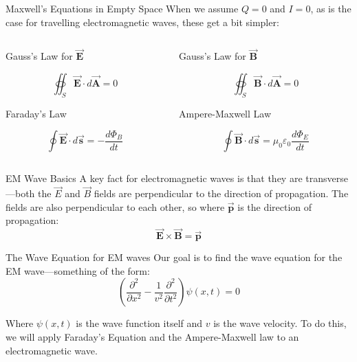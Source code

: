 \documentclass{beamer}
\begin{document}
\begin{frame}{Maxwell's Equations in Empty Space}
    When we assume $Q=0$ and $I=0$, as is the case for travelling electromagnetic waves, these get a bit simpler:
    \begin{columns}
    \begin{column}{0.5\textwidth}
        \begin{center}
            Gauss's Law for $\vec{\mathbf{E}}$
        \end{center}
       \[ \oiint_S \vec{\mathbf{E}}\cdot d\vec{\mathbf{A}} = 0 \]
        \begin{center}
            Faraday's Law
        \end{center}
        \[ \oint \vec{\mathbf{E}}\cdot d\vec{\mathbf{s}} = -\frac{d\Phi_B}{dt}\]
    \end{column}
    
    \begin{column}{0.5\textwidth}
        \begin{center}
            Gauss's Law for $\vec{\mathbf{B}}$
        \end{center}
       \[ \oiint_S \vec{\mathbf{B}}\cdot d\vec{\mathbf{A}} = 0 \]
        \begin{center}
            Ampere-Maxwell Law
        \end{center}
        \[ \oint \vec{\mathbf{B}}\cdot d\vec{\mathbf{s}} = \mu_0\varepsilon_0\frac{d\Phi_E}{dt}\]
    \end{column}
    \end{columns}
\end{frame}

\begin{frame}{EM Wave Basics}
    A key fact for electromagnetic waves is that they are \alert{transverse}---both the $\vec{E}$ and $\vec{B}$ fields are perpendicular to the direction of propagation. The fields are also perpendicular to each other, so where $\vec{\mathbf{p}}$ is the direction of propagation:
    \[ \vec{\mathbf{E}} \times \vec{\mathbf{B}} = \vec{\mathbf{p}} \]
    
\end{frame}

\begin{frame}{The Wave Equation for EM waves}
    Our goal is to find the \alert{wave equation} for the EM wave---something of the form:
    \[ \left(\frac{\partial^2}{\partial x^2}-\frac{1}{v^2}\frac{\partial^2}{\partial t^2}\right)\psi(x,t)=0 \]
    
    Where $\psi(x,t)$ is the wave function itself and $v$ is the wave velocity. To do this, we will apply Faraday's Equation and the Ampere-Maxwell law to an electromagnetic wave. 
    
\end{frame}
\end{document}
